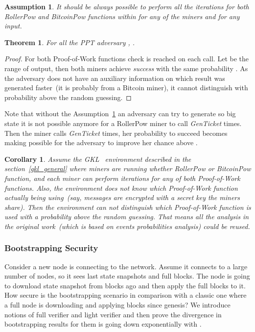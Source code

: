 \documentclass[conference,compsoc]{IEEEtran}
\newtheorem{theorem}{Theorem}
\newtheorem{assumption}{Assumption}
\newtheorem{corollary}{Corollary}
\begin{document}
\begin{assumption}
\label{assume_q}
It should be always possible to perform all the  iterations for both RollerPow and BitcoinPow functions within  for any of the miners and for any input.
\end{assumption}

\begin{theorem}
For all the PPT adversary , .
\end{theorem}
\begin{proof}
For both Proof-of-Work functions  check is reached on each call. Let  be the range of  output, then both miners achieve \textit{success} with the same probability . As the adversary does not have an auxiliary information on which result was generated faster~(it is probably from a Bitcoin miner), it cannot distinguish with probability above the random guessing.
\end{proof}

Note that without the Assumption~\ref{assume_q} an adversary can try to generate so big state it is not possible anymore for a RollerPow miner to call \textit{GenTicket}  times. Then the miner calls \textit{GenTicket}  times, her probability to succeed becomes  making possible for the adversary to improve her chance above .

\begin{corollary}
\label{cor_gkl}
Assume the GKL~\cite{garay2015bitcoin} environment described in the section~\ref{gkl_general} where miners are running whether \textit{RollerPow} or \textit{BitcoinPow} function, and each miner can perform  iterations for any of both Proof-of-Work functions. Also, the environment  does not know which Proof-of-Work function actually being using~(say, messages are encrypted with a secret key the miners share). Then the environment can not distinguish which Proof-of-Work function is used with a probability above the random guessing. That means all the analysis in the original work~(which is based on events probabilities analysis) could be reused. 
\end{corollary}



\subsubsection{Bootstrapping Security}

Consider a new node is connecting to the network. Assume it connects to a large number of nodes, so it sees last  state snapshots and full blocks. The node is going to download state snapshot from  blocks ago and then apply the full blocks to it. How secure is the bootstrapping scenario in comparison with a classic one where a full node is downloading and applying blocks since genesis? We introduce notions of full verifier and light verifier and then prove the divergence in bootstrapping results for them is going down exponentially with .
\end{document}
